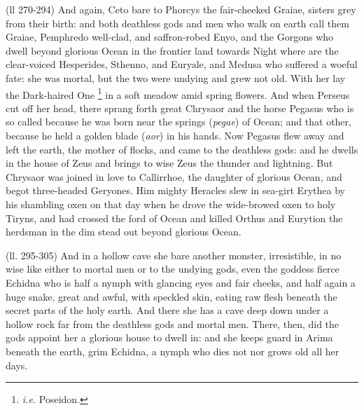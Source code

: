 (ll 270-294) And again, Ceto bare to Phorcys the fair-cheeked Graiae, sisters
grey from their birth: and both deathless gods and men who walk on earth call
them Graiae, Pemphredo well-clad, and saffron-robed Enyo, and the Gorgons who
dwell beyond glorious Ocean in the frontier land towards Night where are the
clear-voiced Hesperides, Sthenno, and Euryale, and Medusa who suffered a woeful
fate: she was mortal, but the two were undying and grew not old. With her lay
the Dark-haired One \footnote{\emph{i.e.} Poseidon.} in a soft meadow amid spring
flowers. And when Perseus cut off her head, there sprang forth great Chrysaor
and the horse Pegasus who is so called because he was born near the springs
(\emph{pegae}) of Ocean; and that other, because he held a golden blade
(\emph{aor}) in his hands. Now Pegasus flew away and left the earth, the mother
of flocks, and came to the deathless gods: and he dwells in the house of Zeus
and brings to wise Zeus the thunder and lightning. But Chrysaor was joined in
love to Callirrhoe, the daughter of glorious Ocean, and begot three-headed
Geryones. Him mighty Heracles slew in sea-girt Erythea by his shambling oxen on
that day when he drove the wide-browed oxen to holy Tiryns, and had crossed the
ford of Ocean and killed Orthus and Eurytion the herdsman in the dim stead out
beyond glorious Ocean.

(ll. 295-305) And in a hollow cave she bare another monster, irresistible, in
no wise like either to mortal men or to the undying gods, even the goddess
fierce Echidna who is half a nymph with glancing eyes and fair cheeks, and half
again a huge snake, great and awful, with speckled skin, eating raw flesh
beneath the secret parts of the holy earth. And there she has a cave deep down
under a hollow rock far from the deathless gods and mortal men. There, then,
did the gods appoint her a glorious house to dwell in: and she keeps guard in
Arima beneath the earth, grim Echidna, a nymph who dies not nor grows old all
her days.

